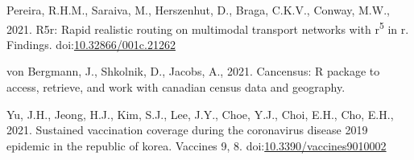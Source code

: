 \documentclass[]{elsarticle} %
\begin{document}
\leavevmode\hypertarget{ref-Pereira2021r5r}{}%
Pereira, R.H.M., Saraiva, M., Herszenhut, D., Braga, C.K.V., Conway,
M.W., 2021. R5r: Rapid realistic routing on multimodal transport
networks with r\textsuperscript{5} in r. Findings.
doi:\href{https://doi.org/10.32866/001c.21262}{10.32866/001c.21262}

\leavevmode\hypertarget{ref-vonBergmann2021cancensus}{}%
von Bergmann, J., Shkolnik, D., Jacobs, A., 2021. Cancensus: R package
to access, retrieve, and work with canadian census data and geography.

\leavevmode\hypertarget{ref-Yu2021sustained}{}%
Yu, J.H., Jeong, H.J., Kim, S.J., Lee, J.Y., Choe, Y.J., Choi, E.H.,
Cho, E.H., 2021. Sustained vaccination coverage during the coronavirus
disease 2019 epidemic in the republic of korea. Vaccines 9, 8.
doi:\href{https://doi.org/10.3390/vaccines9010002}{10.3390/vaccines9010002}
\end{document}
